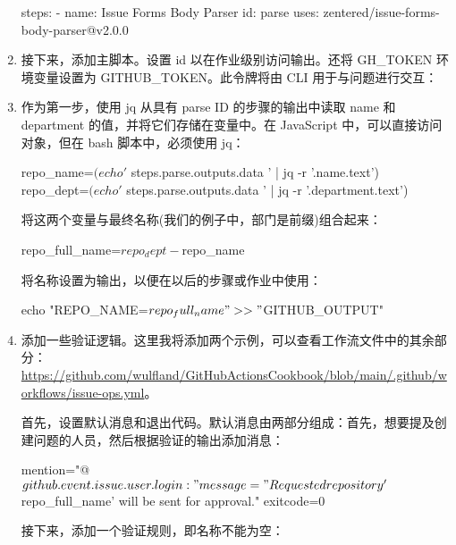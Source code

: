 \begin{enumerate}
\begin{shell}
steps:
  - name: Issue Forms Body Parser
    id: parse
    uses: zentered/issue-forms-body-parser@v2.0.0
\end{shell}

\item 
接下来，添加主脚本。设置 id 以在作业级别访问输出。还将 GH\_TOKEN 环境变量设置为 GITHUB\_TOKEN。此令牌将由 CLI 用于与问题进行交互：


\item 
作为第一步，使用 jq 从具有 parse ID 的步骤的输出中读取 name 和 department 的值，并将它们存储在变量中。在 JavaScript 中，可以直接访问对象，但在 bash 脚本中，必须使用 jq：

\begin{shell}
repo_name=$(echo '${{ steps.parse.outputs.data }}' | jq -r '.name.text')
repo_dept=$(echo '${{ steps.parse.outputs.data }}' | jq -r '.department.text')
\end{shell}

将这两个变量与最终名称(我们的例子中，部门是前缀)组合起来：

\begin{shell}
repo_full_name=$repo_dept-$repo_name
\end{shell}

将名称设置为输出，以便在以后的步骤或作业中使用：

\begin{shell}
echo "REPO_NAME=$repo_full_name" >> "$GITHUB_OUTPUT"
\end{shell}

\item 
添加一些验证逻辑。这里我将添加两个示例，可以查看工作流文件中的其余部分：\url{https://github.com/wulfland/GitHubActionsCookbook/blob/main/.github/workflows/issue-ops.yml}。

首先，设置默认消息和退出代码。默认消息由两部分组成：首先，想要提及创建问题的人员，然后根据验证的输出添加消息：

\begin{shell}
mention="@${{ github.event.issue.user.login }}: "
message="Requested repository '$repo_full_name' will be sent for approval."
exitcode=0
\end{shell}

接下来，添加一个验证规则，即名称不能为空：


\end{enumerate}
